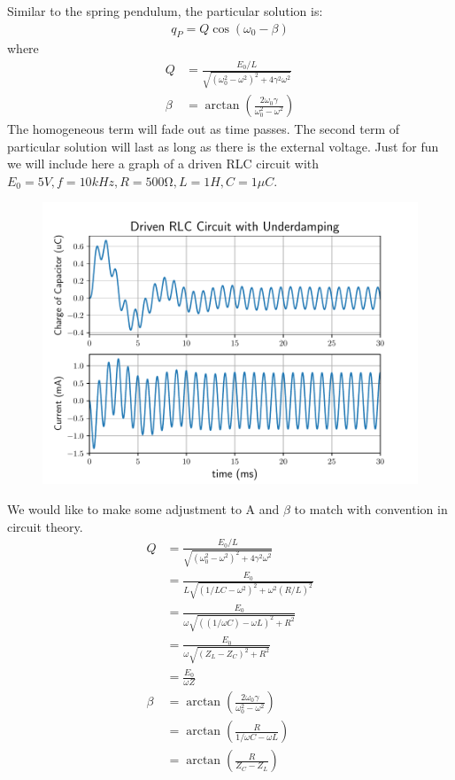 Similar to the spring pendulum, the particular solution is:
\begin{align*}
    q_P = Q \cos(\omega_0 - \beta)
\end{align*}
where 
\begin{align*}
    Q &= \frac{E_0/L}{\sqrt{(\omega_0^2  - \omega^2)^2 + 4\gamma^2\omega^2}} \\
    \beta &= \arctan(\frac{2\omega_0\gamma}{\omega_0^2 - \omega^2}) 
\end{align*}
The homogeneous term will fade out as time passes. The second term of particular solution will last as long as there is the external voltage. Just for fun we will include here a graph of a driven RLC circuit with $E_0 = 5 \si{V}, f = 10 \si{kHz}, R = 500 \si{\ohm}, L = 1 \si{H}, C = 1 \si{\mu C} $.  

\begin{figure}[h]
    \includegraphics[width=150mm,scale=0.5]{test}
\end{figure}

We would like to make some adjustment to A and $\beta$ to match with convention in circuit theory.
\begin{align*}
   Q &= \frac{E_0/L}{\sqrt{(\omega_0^2  - \omega^2)^2 + 4\gamma^2\omega^2}} \\
   &=  \frac{E_0}{L\sqrt{(1/LC  - \omega^2)^2 + \omega^2(R/L)^2}} \\
   &=  \frac{E_0}{\omega\sqrt{((1/\omega C)  - \omega L)^2 + R^2}} \\
   &=  \frac{E_0}{\omega\sqrt{(Z_L  - Z_C)^2 + R^2}} \\
   &= \frac{E_0}{\omega Z} \\
   \beta &= \arctan(\frac{2\omega_0\gamma}{\omega_0^2 - \omega^2})  \\
   &= \arctan(\frac{R}{1/\omega C - \omega L}) \\
   &= \arctan(\frac{R}{Z_C - Z_L}) 
\end{align*}

